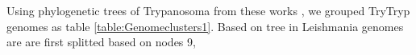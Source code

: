 \documentclass[table,
12pt, %
a4paper, %
oneside, %
headinclude,footinclude, %
BCOR5mm, %
]{scrartcl}
\begin{document}
Using phylogenetic trees of Trypanosoma from these works \cite{Souza:2018dg,Hughes:2003,Pothirat:2014,Kelly:2017}, we grouped TryTryp genomes as table \ref{table:Genomeclusters1}. Based on tree in \cite{Souza:2018dg} Leishmania genomes are are first splitted based on nodes 9, %
\end{document}
